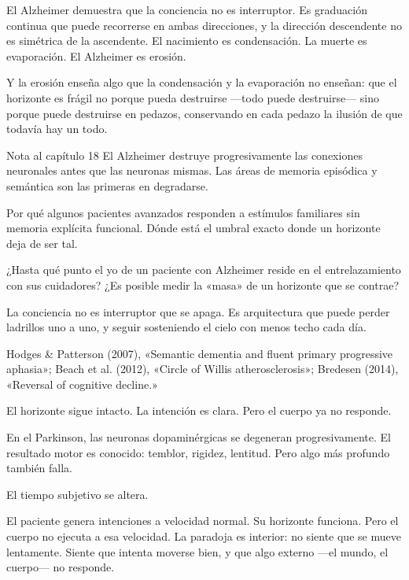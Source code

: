 El Alzheimer demuestra que la conciencia no es interruptor. Es graduación continua que puede recorrerse en ambas direcciones, y la dirección descendente no es simétrica de la ascendente. El nacimiento es condensación. La muerte es evaporación. El Alzheimer es erosión.

Y la erosión enseña algo que la condensación y la evaporación no enseñan: que el horizonte es frágil no porque pueda destruirse —todo puede destruirse— sino porque puede destruirse en pedazos, conservando en cada pedazo la ilusión de que todavía hay un todo.

\begin{notacap}{Nota al capítulo 18}
 El Alzheimer destruye progresivamente las conexiones neuronales antes que las neuronas mismas. Las áreas de memoria episódica y semántica son las primeras en degradarse.

 Por qué algunos pacientes avanzados responden a estímulos familiares sin memoria explícita funcional. Dónde está el umbral exacto donde un horizonte deja de ser tal.

 ¿Hasta qué punto el yo de un paciente con Alzheimer reside en el entrelazamiento con sus cuidadores? ¿Es posible medir la «masa» de un horizonte que se contrae?

 La conciencia no es interruptor que se apaga. Es arquitectura que puede perder ladrillos uno a uno, y seguir sosteniendo el cielo con menos techo cada día.

 Hodges \& Patterson (2007), «Semantic dementia and fluent primary progressive aphasia»; Beach et al. (2012), «Circle of Willis atherosclerosis»; Bredesen (2014), «Reversal of cognitive decline.»
\end{notacap}
\noindent {}

El horizonte sigue intacto. La intención es clara. Pero el cuerpo ya no responde.

\noindent En el Parkinson, las neuronas dopaminérgicas se degeneran progresivamente. El resultado motor es conocido: temblor, rigidez, lentitud. Pero algo más profundo también falla.

El tiempo subjetivo se altera.

El paciente genera intenciones a velocidad normal. Su horizonte funciona. Pero el cuerpo no ejecuta a esa velocidad. La paradoja es interior: no siente que se mueve lentamente. Siente que intenta moverse bien, y que algo externo —el mundo, el cuerpo— no responde.

